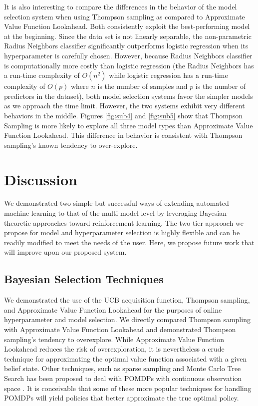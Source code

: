 \documentclass{article}
\begin{document}
It is also interesting to compare the differences in the behavior of the model selection system when using Thompson sampling as compared to Approximate Value Function Lookahead. Both consistently exploit the best-performing model at the beginning. Since the data set is not linearly separable, the non-parametric Radius Neighbors classifier significantly outperforms logistic regression when its hyperparameter is carefully chosen. However, because Radius Neighbors classifier is computationally more costly than logistic regression (the Radius Neighbors has a run-time complexity of $O(n^2)$ while logistic regression has a run-time complexity of $O(p)$ where $n$ is the number of samples and $p$ is the number of predictors in the dataset), both model selection systems favor the simpler models as we approach the time limit. However, the two systems exhibit very different behaviors in the middle. Figures \ref{fig:sub4} and \ref{fig:sub5} show that Thompson Sampling is more likely to explore all three model types than Approximate Value Function Lookahead. This difference in behavior is consistent with Thompson sampling's known tendency to over-explore.

\section{Discussion}
We demonstrated two simple but successful ways of extending automated machine learning to that of the multi-model level by leveraging Bayesian-theoretic approaches toward reinforcement learning. The two-tier approach we propose for model and hyperparameter selection is highly flexible and can be readily modified to meet the needs of the user. Here, we propose future work that will improve upon our proposed system.

\subsection{Bayesian Selection Techniques}
We demonstrated the use of the UCB acquisition function, Thompson sampling, and Approximate Value Function Lookahead for the purposes of online hyperparameter and model selection. We directly compared Thompson sampling with Approximate Value Function Lookahead and demonstrated Thompson sampling's tendency to overexplore. While Approximate Value Function Lookahead reduces the risk of overexploration, it is nevertheless a crude technique for approximating the optimal value function associated with a given belief state. Other techniques, such as sparse sampling and Monte Carlo Tree Search has been proposed to deal with POMDPs with continuous observation space \cite{adaptive}. It is conceivable that some of these more popular techniques for handling POMDPs will yield policies that better approximate the true optimal policy.
\end{document}
